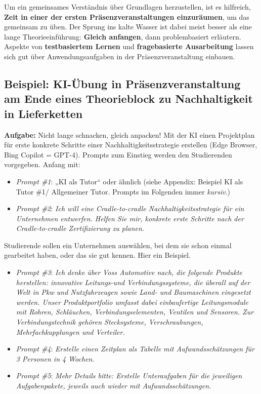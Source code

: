 \documentclass[
  ngerman,
  letterpaper,
  DIV=11]{scrreprt}
\providecommand{\tightlist}{%
  \setlength{\itemsep}{0pt}\setlength{\parskip}{0pt}}
\begin{document}
Um ein gemeinsames Verständnis über Grundlagen herzustellen, ist es
hilfreich, \textbf{Zeit in einer der ersten Präsenzveranstaltungen
einzuräumen}, um das gemeinsam zu üben. Der Sprung ins kalte Wasser ist
dabei meist besser als eine lange Theorieeinführung: \textbf{Gleich
anfangen}, dann problembasiert erläutern. Aspekte von
\textbf{testbasiertem Lernen} und \textbf{fragebasierte Ausarbeitung}
lassen sich gut über Anwendungsaufgaben in der Präsenzveranstaltung
einbauen.

\subsection{Beispiel: KI-Übung in Präsenzveranstaltung am Ende eines
Theorieblock zu Nachhaltigkeit in
Lieferketten}\label{beispiel-ki-uxfcbung-in-pruxe4senzveranstaltung-am-ende-eines-theorieblock-zu-nachhaltigkeit-in-lieferketten}

\textbf{Aufgabe:} Nicht lange schnacken, gleich anpacken! Mit der KI
einen Projektplan für erste konkrete Schritte einer
Nachhaltigkeitsstrategie erstellen (Edge Browser, Bing Copilot = GPT-4).
Prompts zum Einstieg werden den Studierenden vorgegeben. Anfang mit:

\begin{itemize}
\tightlist
\item
  \emph{Prompt \#1}: „KI als Tutor`` oder ähnlich (siehe Appendix:
  Beispiel KI als Tutor \#1/ Allgemeiner Tutor. Prompts im Folgenden
  immer \emph{kursiv}.)
\item
  \emph{Prompt \#2}: \emph{Ich will eine Cradle-to-cradle
  Nachhaltigkeitsstrategie für ein Unternehmen entwerfen. Helfen Sie
  mir, konkrete erste Schritte nach der Cradle-to-cradle Zertifizierung
  zu planen.}
\end{itemize}

Studierende sollen ein Unternehmen auswählen, bei dem sie schon einmal
gearbeitet haben, oder das sie gut kennen. Hier ein Beispiel.

\begin{itemize}
\tightlist
\item
  \emph{Prompt \#3}: \emph{Ich denke über Voss Automotive nach, die
  folgende Produkte herstellen: innovative Leitungs-und
  Verbindungssysteme, die überall auf der Welt in Pkw und Nutzfahrzeugen
  sowie Land- und Baumaschinen eingesetzt werden. Unser Produktportfolio
  umfasst dabei einbaufertige Leitungsmodule mit Rohren, Schläuchen,
  Verbindungselementen, Ventilen und Sensoren. Zur Verbindungstechnik
  gehören Stecksysteme, Verschraubungen, Mehrfachkupplungen und
  Verteiler.}
\item
  \emph{Prompt \#4}: \emph{Erstelle einen Zeitplan als Tabelle mit
  Aufwandsschätzungen für 3 Personen in 4 Wochen.}
\item
  \emph{Prompt \#5}: \emph{Mehr Details bitte: Erstelle Unteraufgaben
  für die jeweiligen Aufgabenpakete, jeweils auch wieder mit
  Aufwandsschätzungen.}
\end{itemize}
\end{document}
